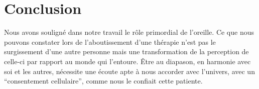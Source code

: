 \chapter{ Conclusion }




Nous avons souligné dans notre travail le rôle primordial de
l'oreille. %
Ce que nous pouvons constater lors de l'aboutissement
d'une thérapie n'est pas le surgissement d'une autre personne mais une transformation
de la perception de celle-ci par rapport au monde qui l'entoure.
Être au diapason, en harmonie avec soi et les autres, nécessite une
écoute apte à nous accorder avec l'univers, avec un \enquote {consentement cellulaire}, comme nous le 
confiait cette patiente.

